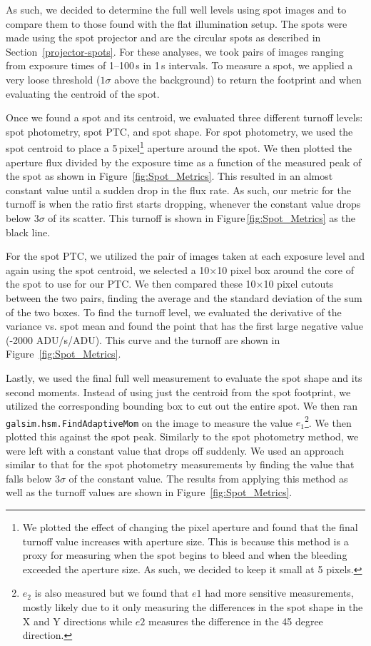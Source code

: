 As such, we decided to determine the full well levels using spot images and to compare them to those found with the flat illumination setup. The spots were made using the spot projector and are the circular spots as described in Section~\ref{projector-spots}. For these analyses, we took pairs of images ranging from exposure times of 1--100\,s in 1\,s intervals. To measure a spot, we applied a very loose threshold ($1\sigma$ above the background) to return the footprint and when evaluating the centroid of the spot.

Once we found a spot and its centroid, we evaluated three different turnoff levels: spot photometry, spot PTC, and spot shape.
For spot photometry, we used the spot centroid to place a 5\,pixel\footnote{We plotted the effect of changing the pixel aperture and found that the final turnoff value increases with aperture size. This is because this method is a proxy for measuring when the spot begins to bleed and when the bleeding exceeded the aperture size. As such, we decided to keep it small at 5 pixels.} aperture around the spot. We then plotted the aperture flux divided by the exposure time as a function of the measured peak of the spot as shown in Figure~\ref{fig:Spot_Metrics}. This resulted in an almost constant value until a sudden drop in the flux rate. As such, our metric for the turnoff is when the ratio first starts dropping, whenever the constant value drops below $3\sigma$ of its scatter. This turnoff is shown in Figure\,\ref{fig:Spot_Metrics} as the black line.

For the spot PTC, we utilized the pair of images taken at each exposure level and again using the spot centroid, we selected a 10$\times$10 pixel box around the core of the spot to use for our PTC. We then compared these 10$\times$10 pixel cutouts between the two pairs, finding the average and the standard deviation of the sum of the two boxes. To find the turnoff level, we evaluated the derivative of the variance vs. spot mean and found the point that has the first large negative value (-2000 ADU/s/ADU). This curve and the turnoff are shown in Figure~\ref{fig:Spot_Metrics}.

Lastly, we used the final full well measurement to evaluate the spot shape and its second moments. Instead of using just the centroid from the spot footprint, we utilized the corresponding bounding box to cut out the entire spot. We then ran \texttt{galsim.hsm.FindAdaptiveMom} on the image to measure the value $e_1$\footnote{$e_2$ is also measured but we found that $e1$ had more sensitive measurements, mostly likely due to it only measuring the differences in the spot shape in the X and Y directions while $e2$ measures the difference in the 45 degree direction.}. We then plotted this against the spot peak. Similarly to the spot photometry method, we were left with a constant value that drops off suddenly. We used an approach similar to that for the spot photometry measurements by finding the value that falls below $3\sigma$ of the constant value. The results from applying this method as well as the turnoff values are shown in Figure~\ref{fig:Spot_Metrics}.

